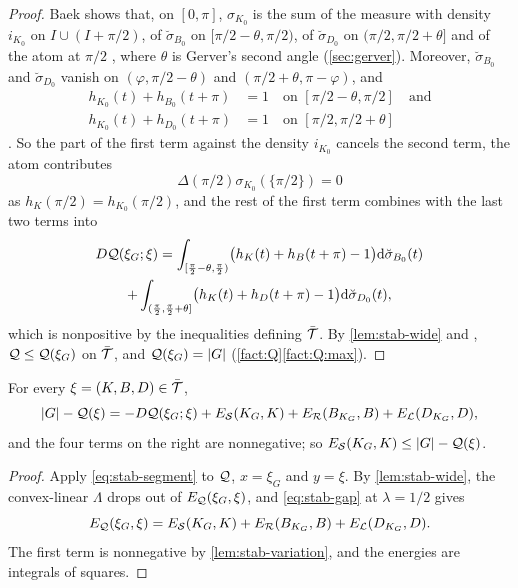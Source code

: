 \begin{proof}
Baek shows that, on $[0,\pi]$, $\sigma_{K_0}$ is the sum of the measure with
density $i_{K_0}$ on $I\cup(I+\pi/2)$, of $\breve\sigma_{B_0}$ on
$[\pi/2-\theta,\pi/2)$, of $\breve\sigma_{D_0}$ on $(\pi/2,\pi/2+\theta]$ and of
the atom at $\pi/2$ , where $\theta$ is Gerver's second angle
(\cref{sec:gerver}). Moreover, $\breve\sigma_{B_0}$ and $\breve\sigma_{D_0}$
vanish on $(\varphi,\pi/2-\theta)$ and $(\pi/2+\theta,\pi-\varphi)$, and
\begin{align*}
  h_{K_0}(t)+h_{B_0}(t+\pi)&=1\quad\text{on }[\pi/2-\theta,\pi/2]
    \quad\text{and}\\
  h_{K_0}(t)+h_{D_0}(t+\pi)&=1\quad\text{on }[\pi/2,\pi/2+\theta]
\end{align*}
. So the part of the first term against the density $i_{K_0}$
cancels the second term, the atom contributes
\[
  \Delta(\pi/2)\sigma_{K_0}(\{\pi/2\})=0
\]
as $h_K(\pi/2)=h_{K_0}(\pi/2)$, and the rest of the first term combines with
the last two terms into
\begin{multline*}
  D\mathcal{Q}(\xi_G;\xi)=\int_{[\frac\pi2-\theta,\frac\pi2)}
    \bigl(h_K(t)+h_B(t+\pi)-1\bigr)\mathrm{d}\breve\sigma_{B_0}(t)\\
  +\int_{(\frac\pi2,\frac\pi2+\theta]}
    \bigl(h_K(t)+h_D(t+\pi)-1\bigr)\mathrm{d}\breve\sigma_{D_0}(t),
\end{multline*}
which is nonpositive by the inequalities defining $\bar{\mathcal{T}}$. By
\cref{lem:stab-wide} and , $\mathcal{Q}\le\mathcal{Q}(\xi_G)$ on $\bar{\mathcal{T}}$,
and $\mathcal{Q}(\xi_G)=\lvert G\rvert$ (\cref{fact:Q}\ref{fact:Q:max}).
\end{proof}

\begin{proposition}\label{prop:stab-certificate}
For every $\xi=(K,B,D)\in\bar{\mathcal{T}}$,
\[
  \lvert G\rvert-\mathcal{Q}(\xi)=-D\mathcal{Q}(\xi_G;\xi)+E_{\mathcal{S}}(K_G,K)+E_{\mathcal{R}}(B_{K_G},B)
    +E_{\mathcal{L}}(D_{K_G},D),
\]
and the four terms on the right are nonnegative; so
$E_{\mathcal{S}}(K_G,K)\le\lvert G\rvert-\mathcal{Q}(\xi)$.
\end{proposition}

\begin{proof}
Apply \eqref{eq:stab-segment} to $\mathcal{Q}$, $x=\xi_G$ and $y=\xi$. By
\cref{lem:stab-wide}, the convex-linear $\Lambda$ drops out of
$E_{\mathcal{Q}}(\xi_G,\xi)$, and \eqref{eq:stab-gap} at $\lambda=1/2$ gives
\[
  E_{\mathcal{Q}}(\xi_G,\xi)=E_{\mathcal{S}}(K_G,K)+E_{\mathcal{R}}(B_{K_G},B)+E_{\mathcal{L}}(D_{K_G},D).
\]
The first term is nonnegative by \cref{lem:stab-variation}, and the energies
are integrals of squares.
\end{proof}

